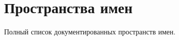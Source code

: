 \section{Пространства имен}
Полный список документированных пространств имен.\begin{DoxyCompactList}
\item{}
\end{DoxyCompactList}
